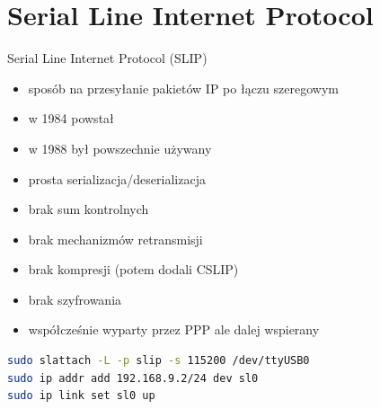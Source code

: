 \section{Serial Line Internet Protocol}
    \begin{frame}[fragile]{Serial Line Internet Protocol (SLIP)}
        \begin{itemize}
            \item sposób na przesyłanie pakietów IP po łączu szeregowym
            \item w 1984 powstał
            \item w 1988 był powszechnie używany
            \item prosta serializacja/deserializacja
            \item brak sum kontrolnych
            \item brak mechanizmów retransmisji
            \item brak kompresji (potem dodali CSLIP)
            \item brak szyfrowania
            \item współcześnie wyparty przez PPP ale dalej wspierany
        \end{itemize}

        \begin{lstlisting}[language=bash]
sudo slattach -L -p slip -s 115200 /dev/ttyUSB0
sudo ip addr add 192.168.9.2/24 dev sl0
sudo ip link set sl0 up
        \end{lstlisting}
    \end{frame}
